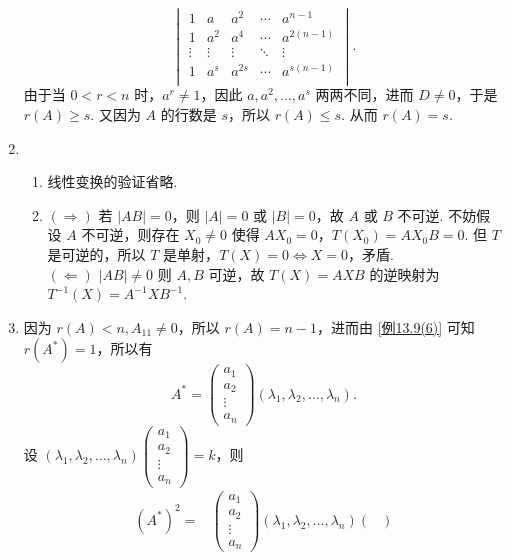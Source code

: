 \begin{enumerate}
\[\begin{vmatrix}
        1 & a & a^2 & \cdots & a^{n-1} \\
        1 & a^2 & a^4 & \cdots & a^{2(n-1)} \\
        \vdots & \vdots & \vdots & \ddots & \vdots \\
        1 & a^s & a^{2s} & \cdots & a^{s(n-1)} \\
    \end{vmatrix}.\] 由于当 $0 < r < n$ 时，$a^r \neq 1$，因此 $a, a^2, \ldots, a^s$ 两两不同，进而 $D \neq 0$，于是 $r(A) \geqslant s$. 又因为 $A$ 的行数是 $s$，所以 $r(A) \leqslant s$. 从而 $r(A) = s$.
    \item \begin{enumerate}
        \item 线性变换的验证省略.
        \item $(\Rightarrow)$ 若 $\lvert AB \rvert = 0$，则 $\lvert A \rvert = 0$ 或 $\lvert B \rvert = 0$，故 $A$ 或 $B$ 不可逆. 不妨假设 $A$ 不可逆，则存在 $X_0 \neq 0$ 使得 $AX_0 = 0$，$T(X_0) = AX_0B = 0$. 但 $T$ 是可逆的，所以 $T$ 是单射，$T(X) = 0 \Leftrightarrow X = 0$，矛盾. \\
        $(\Leftarrow)$ $\lvert AB \rvert \neq 0$ 则 $A, B$ 可逆，故 $T(X) = AXB$ 的逆映射为 $T^{-1}(X) = A^{-1}XB^{-1}$.
    \end{enumerate}
    \item 因为 $r(A) < n, A_{11} \neq 0$，所以 $r(A) = n-1$，进而由 \ref*{例13.9(6)} 可知 $r(A^*) = 1$，所以有 \[A^* = \begin{pmatrix}
        a_1 \\
        a_2 \\
        \vdots \\
        a_n
    \end{pmatrix} (\lambda_1, \lambda_2, \ldots, \lambda_n).\] 设 $(\lambda_1, \lambda_2, \ldots, \lambda_n) \begin{pmatrix}
        a_1 \\
        a_2 \\
        \vdots \\
        a_n
    \end{pmatrix} = k$，则 \begin{align*}
        (A^*)^2 ={} & \begin{pmatrix}
            a_1 \\
            a_2 \\
            \vdots \\
            a_n
        \end{pmatrix} (\lambda_1, \lambda_2, \ldots, \lambda_n)\begin{pmatrix}

\end{pmatrix}
\end{align*}
\end{enumerate}
